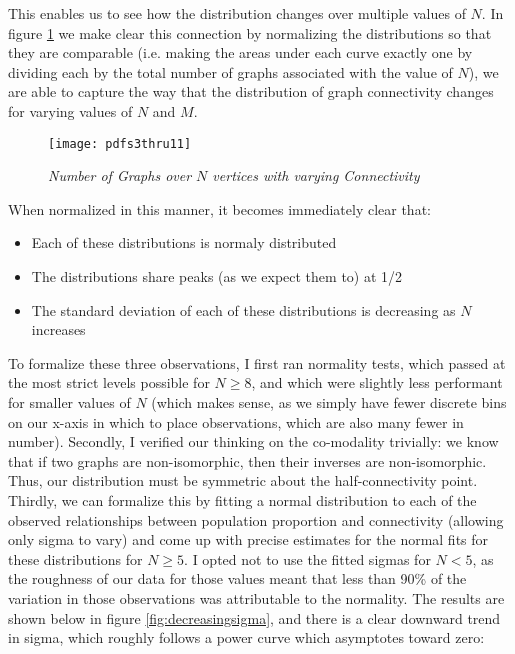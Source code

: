 This enables us to see how the distribution changes over multiple values of $N$.
In figure \ref{fig:ngraphs} we make clear this connection by normalizing the distributions so that they are comparable (i.e. making the areas under each curve exactly one by dividing each by the total number of graphs associated with the value of $N$), we are able to capture the way that the distribution of graph connectivity changes for varying values of $N$ and $M$.

\begin{figure}[h]
\caption{\emph{Number of Graphs over $N$ vertices with varying Connectivity}}
\centering
\texttt{[image: pdfs3thru11]}
\label{fig:ngraphs}
\end{figure}

When normalized in this manner, it becomes immediately clear that:
\begin{itemize}
\item{Each of these distributions is normaly distributed}
\item{The distributions share peaks (as we expect them to) at 1/2}
\item{The standard deviation of each of these distributions is decreasing as $N$ increases}
\end{itemize}

To formalize these three observations, I first ran normality tests, which passed at the most strict levels possible for $N \geq 8$, and which were slightly less performant for smaller values of $N$ (which makes sense, as we simply have fewer discrete bins on our x-axis in which to place observations, which are also many fewer in number).
Secondly, I verified our thinking on the co-modality trivially: we know that if two graphs are non-isomorphic, then their inverses are non-isomorphic.
Thus, our distribution must be symmetric about the half-connectivity point.
Thirdly, we can formalize this by fitting a normal distribution to each of the observed relationships between population proportion and connectivity (allowing only sigma to vary) and come up with precise estimates for the normal fits for these distributions for $N \geq 5$.
I opted not to use the fitted sigmas for $N < 5$, as the roughness of our data for those values meant that less than 90\% of the variation in those observations was attributable to the normality.
The results are shown below in figure \ref{fig:decreasingsigma}, and there is a clear downward trend in sigma, which roughly follows a power curve which asymptotes toward zero:

